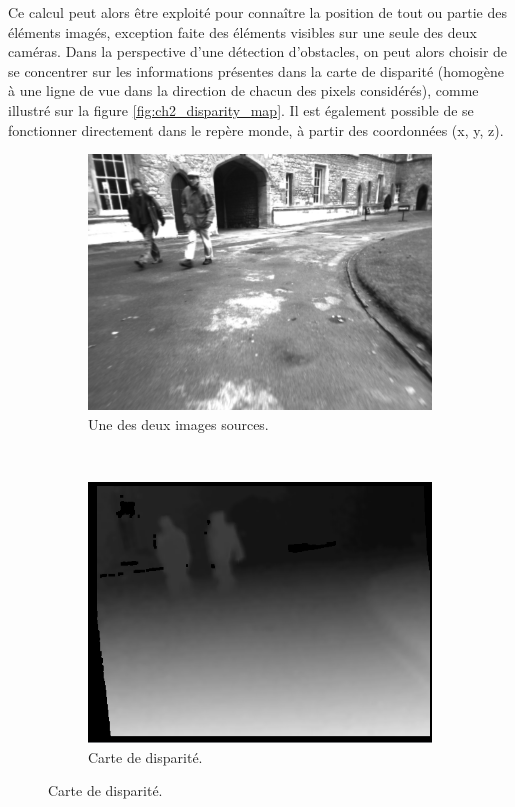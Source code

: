 Ce calcul peut alors être exploité pour connaître la position de tout ou partie des éléments imagés, exception faite des éléments visibles sur une seule des deux caméras. Dans la perspective d'une détection d'obstacles, on peut alors choisir de se concentrer sur les informations présentes dans la carte de disparité (homogène à une ligne de vue dans la direction de chacun des pixels considérés), comme illustré sur la figure \ref{fig:ch2_disparity_map}. Il est également possible de se fonctionner directement dans le repère \og monde\fg{}, à partir des coordonnées (x, y, z).\\

\begin{figure}[h]
	\begin{center}
		\begin{subfigure}{0.48\textwidth}
			\includegraphics[width=\textwidth]{Chapter3/graphics/OF_Farneback_RAW.png} 
			\caption{Une des deux images sources.}
		\end{subfigure}	
		~	
		\begin{subfigure}{0.48\textwidth}
			\includegraphics[width=\textwidth]{Chapter2/graphics/dense_disparity.png} 
			\caption{Carte de disparité.}
		\end{subfigure}
		

\end{center}
\end{figure}

